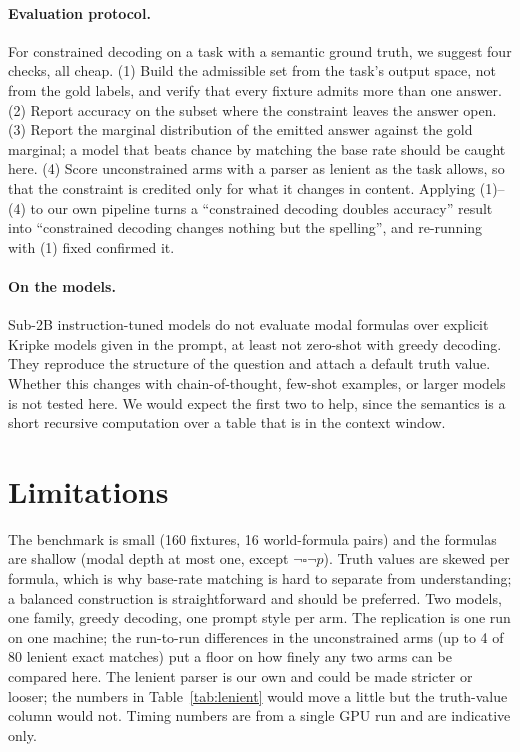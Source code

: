 \documentclass[11pt]{article}
\renewcommand{\Box}{\square}
\begin{document}
\paragraph{Evaluation protocol.} For constrained decoding on a task with a semantic ground truth, we suggest four checks, all cheap. (1) Build the admissible set from the task's output space, not from the gold labels, and verify that every fixture admits more than one answer. (2) Report accuracy on the subset where the constraint leaves the answer open. (3) Report the marginal distribution of the emitted answer against the gold marginal; a model that beats chance by matching the base rate should be caught here. (4) Score unconstrained arms with a parser as lenient as the task allows, so that the constraint is credited only for what it changes in content. Applying (1)--(4) to our own pipeline turns a ``constrained decoding doubles accuracy'' result into ``constrained decoding changes nothing but the spelling'', and re-running with (1) fixed confirmed it.

\paragraph{On the models.} Sub-2B instruction-tuned models do not evaluate modal formulas over explicit Kripke models given in the prompt, at least not zero-shot with greedy decoding. They reproduce the structure of the question and attach a default truth value. Whether this changes with chain-of-thought, few-shot examples, or larger models is not tested here. We would expect the first two to help, since the semantics is a short recursive computation over a table that is in the context window.

\section{Limitations}

The benchmark is small (160 fixtures, 16 world-formula pairs) and the formulas are shallow (modal depth at most one, except $\neg\Box\neg p$). Truth values are skewed per formula, which is why base-rate matching is hard to separate from understanding; a balanced construction is straightforward and should be preferred. Two models, one family, greedy decoding, one prompt style per arm. The replication is one run on one machine; the run-to-run differences in the unconstrained arms (up to 4 of 80 lenient exact matches) put a floor on how finely any two arms can be compared here. The lenient parser is our own and could be made stricter or looser; the numbers in Table~\ref{tab:lenient} would move a little but the truth-value column would not. Timing numbers are from a single GPU run and are indicative only.
\end{document}
